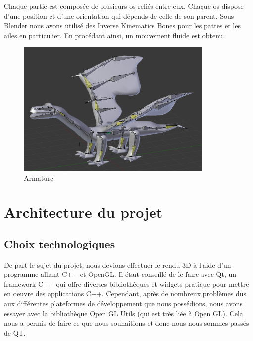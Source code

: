 \documentclass[a4paper]{report}
\begin{document}
Chaque partie est composée de plusieurs os reliés entre eux. Chaque os dispose d'une position et d'une orientation qui dépends de celle de son parent. Sous Blender nous avons utilisé des Inverse Kinematics Bones pour les pattes et les ailes en particulier. En procédant ainsi, un mouvement fluide est obtenu.

\begin{figure}[H]
    \begin{center}
        \includegraphics[width=0.85\textwidth]{armature.png}
        \caption{Armature}
    \end{center}
\end{figure}
\newpage

\chapter{Architecture du projet}
\section{Choix technologiques}
De part le sujet du projet, nous devions effectuer le rendu 3D à l'aide d'un programme alliant C++ et OpenGL. Il était conseillé de le faire avec Qt, un framework C++ qui offre diverses bibliothèques et widgets pratique pour mettre en oeuvre des applications C++. Cependant, après de nombreux problèmes dus aux différentes plateformes de développement que nous possédions, nous avons essayer avec la bibliothèque Open GL Utils (qui est très liée à Open GL). Cela nous a permis de faire ce que nous souhaitions et donc nous nous sommes passés de QT.
\end{document}
